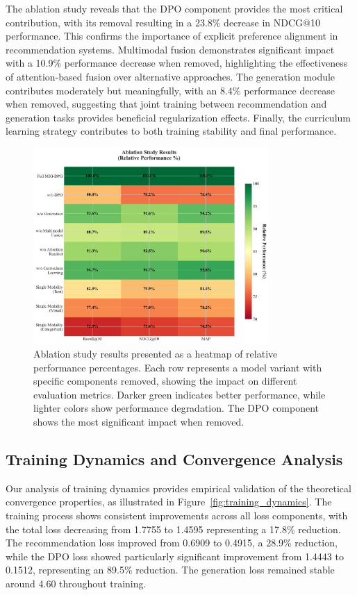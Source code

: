 \documentclass[pdflatex,sn-mathphys-num]{sn-jnl}%
\theoremstyle{thmstyleone}%
\theoremstyle{thmstyletwo}%
\theoremstyle{thmstylethree}%
\begin{document}
The ablation study reveals that the DPO component provides the most critical contribution, with its removal resulting in a 23.8\% decrease in NDCG@10 performance. This confirms the importance of explicit preference alignment in recommendation systems. Multimodal fusion demonstrates significant impact with a 10.9\% performance decrease when removed, highlighting the effectiveness of attention-based fusion over alternative approaches. The generation module contributes moderately but meaningfully, with an 8.4\% performance decrease when removed, suggesting that joint training between recommendation and generation tasks provides beneficial regularization effects. Finally, the curriculum learning strategy contributes to both training stability and final performance.

\begin{figure}[t]
\centering
\includegraphics[width=0.8\textwidth]{figures/ablation_heatmap.pdf}
\caption{Ablation study results presented as a heatmap of relative performance percentages. Each row represents a model variant with specific components removed, showing the impact on different evaluation metrics. Darker green indicates better performance, while lighter colors show performance degradation. The DPO component shows the most significant impact when removed.}
\label{fig:ablation_heatmap}
\end{figure}

\subsection{Training Dynamics and Convergence Analysis}

Our analysis of training dynamics provides empirical validation of the theoretical convergence properties, as illustrated in Figure~\ref{fig:training_dynamics}. The training process shows consistent improvements across all loss components, with the total loss decreasing from 1.7755 to 1.4595 representing a 17.8\% reduction. The recommendation loss improved from 0.6909 to 0.4915, a 28.9\% reduction, while the DPO loss showed particularly significant improvement from 1.4443 to 0.1512, representing an 89.5\% reduction. The generation loss remained stable around 4.60 throughout training.
\end{document}
